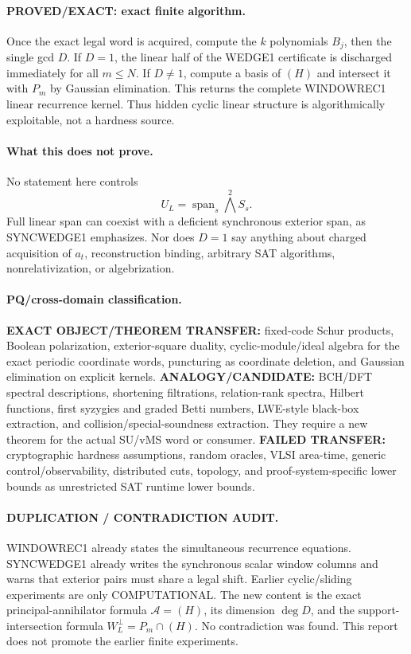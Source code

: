 \documentclass[11pt]{article}
\begin{document}
\paragraph{PROVED/EXACT: exact finite algorithm.}
Once the exact legal word is acquired, compute the \(k\) polynomials \(B_j\), then the single gcd \(D\). If \(D=1\), the linear half of the WEDGE1 certificate is discharged immediately for all \(m\le N\). If \(D\ne1\), compute a basis of \((H)\) and intersect it with \(P_m\) by Gaussian elimination. This returns the complete WINDOWREC1 linear recurrence kernel. Thus hidden cyclic linear structure is algorithmically exploitable, not a hardness source.

\paragraph{What this does not prove.}
No statement here controls
\[
U_L=\operatorname{span}_s\bigwedge^2S_s.
\]
Full linear span can coexist with a deficient synchronous exterior span, as SYNCWEDGE1 emphasizes. Nor does \(D=1\) say anything about charged acquisition of \(a_t\), reconstruction binding, arbitrary SAT algorithms, nonrelativization, or algebrization.

\paragraph{PQ/cross-domain classification.}
\textbf{EXACT OBJECT/THEOREM TRANSFER:} fixed-code Schur products, Boolean polarization, exterior-square duality, cyclic-module/ideal algebra for the exact periodic coordinate words, puncturing as coordinate deletion, and Gaussian elimination on explicit kernels.
\textbf{ANALOGY/CANDIDATE:} BCH/DFT spectral descriptions, shortening filtrations, relation-rank spectra, Hilbert functions, first syzygies and graded Betti numbers, LWE-style black-box extraction, and collision/special-soundness extraction. They require a new theorem for the actual SU/vMS word or consumer.
\textbf{FAILED TRANSFER:} cryptographic hardness assumptions, random oracles, VLSI area-time, generic control/observability, distributed cuts, topology, and proof-system-specific lower bounds as unrestricted SAT runtime lower bounds.

\paragraph{DUPLICATION / CONTRADICTION AUDIT.}
WINDOWREC1 already states the simultaneous recurrence equations. SYNCWEDGE1 already writes the synchronous scalar window columns and warns that exterior pairs must share a legal shift. Earlier cyclic/sliding experiments are only COMPUTATIONAL. The new content is the exact principal-annihilator formula \(\mathcal A=(H)\), its dimension \(\deg D\), and the support-intersection formula \(W_L^\perp=P_m\cap(H)\). No contradiction was found. This report does not promote the earlier finite experiments.
\end{document}
